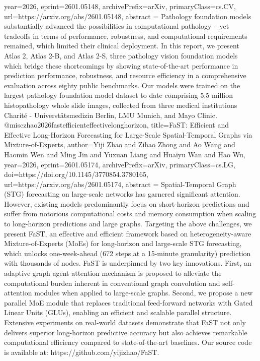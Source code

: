 {      year={2026},
      eprint={2601.05148},
      archivePrefix={arXiv},
      primaryClass={cs.CV},
      url={https://arxiv.org/abs/2601.05148},
      abstract = {Pathology foundation models substantially advanced the possibilities in computational pathology -- yet tradeoffs in terms of performance, robustness, and computational requirements remained, which limited their clinical deployment. In this report, we present Atlas 2, Atlas 2-B, and Atlas 2-S, three pathology vision foundation models which bridge these shortcomings by showing state-of-the-art performance in prediction performance, robustness, and resource efficiency in a comprehensive evaluation across eighty public benchmarks. Our models were trained on the largest pathology foundation model dataset to date comprising 5.5 million histopathology whole slide images, collected from three medical institutions Charité - Universtätsmedizin Berlin, LMU Munich, and Mayo Clinic.}
}@misc{zhao2026fastefficienteffectivelonghorizon,
      title={FaST: Efficient and Effective Long-Horizon Forecasting for Large-Scale Spatial-Temporal Graphs via Mixture-of-Experts}, 
      author={Yiji Zhao and Zihao Zhong and Ao Wang and Haomin Wen and Ming Jin and Yuxuan Liang and Huaiyu Wan and Hao Wu},
      year={2026},
      eprint={2601.05174},
      archivePrefix={arXiv},
      primaryClass={cs.LG},
      doi={https://doi.org/10.1145/3770854.3780165},
      url={https://arxiv.org/abs/2601.05174},
      abstract = {Spatial-Temporal Graph (STG) forecasting on large-scale networks has garnered significant attention. However, existing models predominantly focus on short-horizon predictions and suffer from notorious computational costs and memory consumption when scaling to long-horizon predictions and large graphs. Targeting the above challenges, we present FaST, an effective and efficient framework based on heterogeneity-aware Mixture-of-Experts (MoEs) for long-horizon and large-scale STG forecasting, which unlocks one-week-ahead (672 steps at a 15-minute granularity) prediction with thousands of nodes. FaST is underpinned by two key innovations. First, an adaptive graph agent attention mechanism is proposed to alleviate the computational burden inherent in conventional graph convolution and self-attention modules when applied to large-scale graphs. Second, we propose a new parallel MoE module that replaces traditional feed-forward networks with Gated Linear Units (GLUs), enabling an efficient and scalable parallel structure. Extensive experiments on real-world datasets demonstrate that FaST not only delivers superior long-horizon predictive accuracy but also achieves remarkable computational efficiency compared to state-of-the-art baselines. Our source code is available at: https://github.com/yijizhao/FaST.}
}
